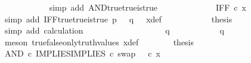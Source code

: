 \begin{isabellebody}
\ \ \ \ \ \ \ \ \ \ \isamarkupfalse%
\ {\isacharparenleft}{\kern0pt}simp\ add{\isacharcolon}{\kern0pt}\ AND{\isacharunderscore}{\kern0pt}true{\isacharunderscore}{\kern0pt}true{\isacharunderscore}{\kern0pt}is{\isacharunderscore}{\kern0pt}true{\isacharparenright}{\kern0pt}\isanewline
\ \ \ \ \ \ \ \ \isamarkupfalse%
\ \isamarkupfalse%
\ {\isachardoublequoteopen}{\isachardot}{\kern0pt}{\isachardot}{\kern0pt}{\isachardot}{\kern0pt}\ {\isacharequal}{\kern0pt}\ IFF\ {\isasymcirc}\isactrlsub c\ x{\isachardoublequoteclose}\isanewline
\ \ \ \ \ \ \ \ \ \ \isamarkupfalse%
\ {\isacharparenleft}{\kern0pt}simp\ add{\isacharcolon}{\kern0pt}\ IFF{\isacharunderscore}{\kern0pt}true{\isacharunderscore}{\kern0pt}true{\isacharunderscore}{\kern0pt}is{\isacharunderscore}{\kern0pt}true\ {\isacartoucheopen}p\ {\isacharequal}{\kern0pt}\ {\isasymt}{\isacartoucheclose}\ {\isacartoucheopen}q\ {\isacharequal}{\kern0pt}\ {\isasymt}{\isacartoucheclose}\ x{\isacharunderscore}{\kern0pt}def{\isacharparenright}{\kern0pt}\isanewline
\ \ \ \ \ \ \ \ \isamarkupfalse%
\ \isamarkupfalse%
\ {\isacharquery}{\kern0pt}thesis\isanewline
\ \ \ \ \ \ \ \ \ \ \isamarkupfalse%
\ {\isacharparenleft}{\kern0pt}simp\ add{\isacharcolon}{\kern0pt}\ calculation{\isacharparenright}{\kern0pt}\isanewline
\ \ \ \ \ \ \isamarkupfalse%
\isanewline
\ \ \ \ \isamarkupfalse%
\isanewline
\ \ \ \ \ \ \isamarkupfalse%
\ {\isachardoublequoteopen}q\ {\isasymnoteq}\ {\isasymt}{\isachardoublequoteclose}\isanewline
\ \ \ \ \ \ \isamarkupfalse%
\ \isamarkupfalse%
\ {\isachardoublequoteopen}q\ {\isacharequal}{\kern0pt}\ {\isasymf}{\isachardoublequoteclose}\isanewline
\ \ \ \ \ \ \ \ \isamarkupfalse%
\ {\isacharparenleft}{\kern0pt}meson\ true{\isacharunderscore}{\kern0pt}false{\isacharunderscore}{\kern0pt}only{\isacharunderscore}{\kern0pt}truth{\isacharunderscore}{\kern0pt}values\ x{\isacharunderscore}{\kern0pt}def{\isacharparenright}{\kern0pt}\isanewline
\ \ \ \ \ \ \isamarkupfalse%
\ {\isacharquery}{\kern0pt}thesis\isanewline
\ \ \ \ \ \ \isamarkupfalse%
\ {\isacharminus}{\kern0pt}\ \isanewline
\ \ \ \ \ \ \ \ \isamarkupfalse%
\ {\isachardoublequoteopen}{\isacharparenleft}{\kern0pt}AND\ {\isasymcirc}\isactrlsub c\ {\isasymlangle}IMPLIES{\isacharcomma}{\kern0pt}IMPLIES\ {\isasymcirc}\isactrlsub c\ swap\ {\isasymOmega}\ {\isasymOmega}{\isasymrangle}{\isacharparenright}{\kern0pt}\ {\isasymcirc}\isactrlsub c\ x\ {\isacharequal}{\kern0pt}\ \ \ \ \isanewline

\end{isabellebody}
